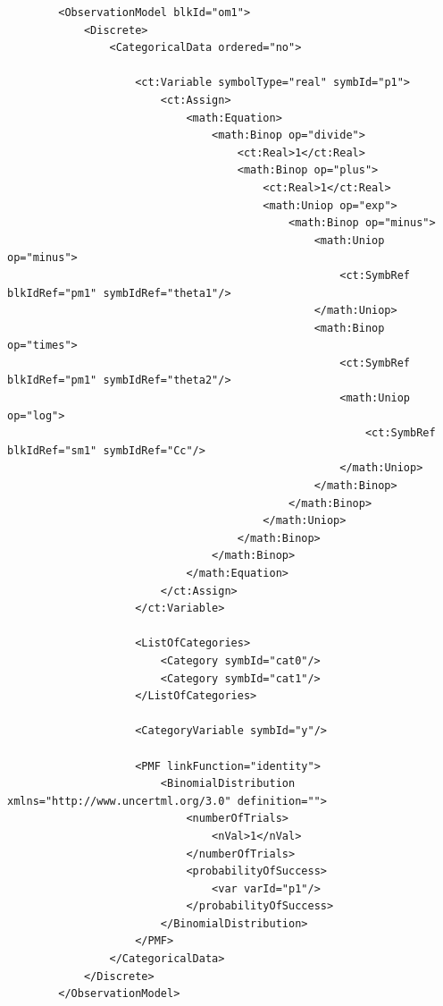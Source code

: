 \lstset{language=XML}
\begin{lstlisting}
        <ObservationModel blkId="om1">
            <Discrete>
                <CategoricalData ordered="no">
                    
                    <ct:Variable symbolType="real" symbId="p1">
                        <ct:Assign>
                            <math:Equation>
                                <math:Binop op="divide">
                                    <ct:Real>1</ct:Real>
                                    <math:Binop op="plus">
                                        <ct:Real>1</ct:Real>
                                        <math:Uniop op="exp">
                                            <math:Binop op="minus">
                                                <math:Uniop op="minus">
                                                    <ct:SymbRef blkIdRef="pm1" symbIdRef="theta1"/>
                                                </math:Uniop>
                                                <math:Binop op="times">
                                                    <ct:SymbRef blkIdRef="pm1" symbIdRef="theta2"/>
                                                    <math:Uniop op="log">
                                                        <ct:SymbRef blkIdRef="sm1" symbIdRef="Cc"/>
                                                    </math:Uniop>
                                                </math:Binop>
                                            </math:Binop>
                                        </math:Uniop>
                                    </math:Binop>
                                </math:Binop>
                            </math:Equation>                            
                        </ct:Assign>
                    </ct:Variable>
                    
                    <ListOfCategories> 
                        <Category symbId="cat0"/>
                        <Category symbId="cat1"/>
                    </ListOfCategories>
                    
                    <CategoryVariable symbId="y"/>
                    
                    <PMF linkFunction="identity">
                        <BinomialDistribution xmlns="http://www.uncertml.org/3.0" definition="">
                            <numberOfTrials>
                                <nVal>1</nVal>
                            </numberOfTrials>
                            <probabilityOfSuccess>
                                <var varId="p1"/>
                            </probabilityOfSuccess>
                        </BinomialDistribution>
                    </PMF>
                </CategoricalData>
            </Discrete>
        </ObservationModel>
\end{lstlisting}

